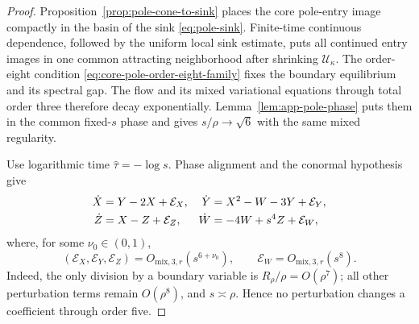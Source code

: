 \documentclass[11pt]{amsart}
\numberwithin{equation}{section}
\theoremstyle{definition}
\theoremstyle{remark}
\newcommand{\cU}{\mathcal U}
\begin{document}
\begin{proof}
Proposition~\ref{prop:pole-cone-to-sink} places the core pole-entry image
compactly in the basin of the sink \eqref{eq:pole-sink}.  Finite-time
continuous dependence, followed by the uniform local sink estimate, puts
all continued entry images in one common attracting neighborhood after
shrinking $\cU_\kappa$.  The order-eight condition
\eqref{eq:core-pole-order-eight-family} fixes the boundary equilibrium and
its spectral gap.  The flow
and its mixed variational equations through total order three therefore
decay exponentially.  Lemma~\ref{lem:app-pole-phase} puts them in the
common fixed-$s$ phase and gives $s/\rho\to\sqrt6$ with the same mixed
regularity.

Use logarithmic time $\widehat\tau=-\log s$.  Phase alignment and the
conormal hypothesis give
\begin{align}
 \dot X&=Y-2X+\mathcal E_X,&
 \dot Y&=X^2-W-3Y+\mathcal E_Y,\notag\\
 \dot Z&=X-Z+\mathcal E_Z,&
 \dot W&=-4W+s^4Z+\mathcal E_W,
 \label{eq:app-perturbed-pole-system}
\end{align}
where, for some $\nu_0\in(0,1)$,
\begin{equation}\label{eq:app-pole-perturbation-orders}
 (\mathcal E_X,\mathcal E_Y,\mathcal E_Z)
 =O_{\mathrm{mix},3,r}(s^{6+\nu_0}),
 \qquad
 \mathcal E_W=O_{\mathrm{mix},3,r}(s^8).
\end{equation}
Indeed, the only division by a boundary variable is
$R_\rho/\rho=O(\rho^7)$; all other perturbation terms remain
$O(\rho^8)$, and $s\asymp\rho$.  Hence no perturbation changes a coefficient
through order five.


\end{proof}
\end{document}
